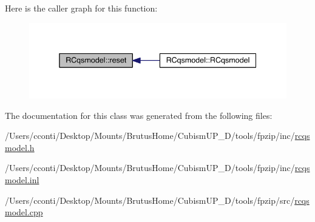 Here is the caller graph for this function\+:\nopagebreak
\begin{figure}[H]
\begin{center}
\leavevmode
\includegraphics[width=338pt]{d0/df1/class_r_cqsmodel_af07f233f4bfbefaf37a115cf4449da9a_icgraph}
\end{center}
\end{figure}




The documentation for this class was generated from the following files\+:\begin{DoxyCompactItemize}
\item 
/\+Users/cconti/\+Desktop/\+Mounts/\+Brutus\+Home/\+Cubism\+U\+P\+\_\+D/tools/fpzip/inc/\hyperlink{rcqsmodel_8h}{rcqsmodel.\+h}\item 
/\+Users/cconti/\+Desktop/\+Mounts/\+Brutus\+Home/\+Cubism\+U\+P\+\_\+D/tools/fpzip/inc/\hyperlink{rcqsmodel_8inl}{rcqsmodel.\+inl}\item 
/\+Users/cconti/\+Desktop/\+Mounts/\+Brutus\+Home/\+Cubism\+U\+P\+\_\+D/tools/fpzip/src/\hyperlink{rcqsmodel_8cpp}{rcqsmodel.\+cpp}\end{DoxyCompactItemize}
